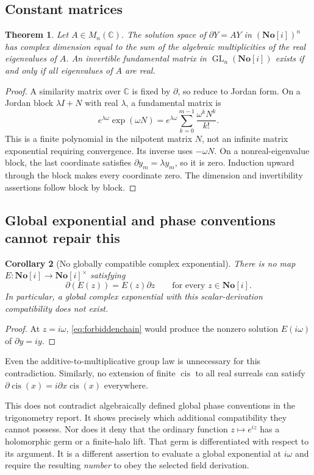 \documentclass[11pt,a4paper]{article}
\newtheorem{theorem}{Theorem}[section]
\newtheorem{corollary}[theorem]{Corollary}
\theoremstyle{definition}
\newcommand{\SC}{\mathbf{No}[i]}
\newcommand{\C}{\mathbb C}
\newcommand{\D}{\partial}
\newcommand{\cis}{\operatorname{cis}}
\newcommand{\GL}{\operatorname{GL}}
\numberwithin{equation}{section}
\begin{document}
\subsection{Constant matrices}
\begin{theorem}\label{thm:matrix}
Let $A\in M_n(\C)$. The solution space of $\D Y=AY$ in $(\SC)^n$ has
complex dimension equal to the sum of the algebraic multiplicities of the
\emph{real} eigenvalues of $A$. An invertible fundamental matrix in
$\GL_n(\SC)$ exists if and only if all eigenvalues of $A$ are real.
\end{theorem}
\begin{proof}
A similarity matrix over $\C$ is fixed by $\D$, so reduce to Jordan
form. On a Jordan block $\lambda I+N$ with real $\lambda$, a fundamental
matrix is
\[
 e^{\lambda\omega}\exp(\omega N)
 =e^{\lambda\omega}\sum_{k=0}^{m-1}\frac{\omega^kN^k}{k!}.
\]
This is a finite polynomial in the nilpotent matrix $N$, not an infinite
matrix exponential requiring convergence. Its inverse uses $-\omega N$.
On a nonreal-eigenvalue block, the last coordinate satisfies
$\D y_m=\lambda y_m$, so it is zero. Induction upward through the block
makes every coordinate zero. The dimension and invertibility assertions
follow block by block.
\end{proof}

\subsection{Global exponential and phase conventions cannot repair this}
\begin{corollary}[No globally compatible complex exponential]
\label{cor:noglobalexp}
There is no map $E:\SC\to\SC^\times$ satisfying
\begin{equation}\label{eq:forbiddenchain}
 \D(E(z))=E(z)\D z\qquad\text{for every }z\in\SC.
\end{equation}
In particular, a global complex exponential with this scalar-derivation
compatibility does not exist.
\end{corollary}
\begin{proof}
At $z=i\omega$, \eqref{eq:forbiddenchain} would produce the nonzero
solution $E(i\omega)$ of $\D y=iy$.
\end{proof}
Even the additive-to-multiplicative group law is unnecessary for this
contradiction. Similarly, no extension of finite $\cis$ to all real
surreals can satisfy $\D\cis(x)=i\D x\cis(x)$ everywhere.

This does not contradict algebraically defined global phase conventions
in the trigonometry report. It shows precisely which additional
compatibility they cannot possess. Nor does it deny that the ordinary
function $z\mapsto e^{iz}$ has a holomorphic germ or a finite-halo lift.
That germ is differentiated with respect to its argument. It is a
different assertion to evaluate a global exponential at $i\omega$ and
require the resulting \emph{number} to obey the selected field derivation.
\end{document}
